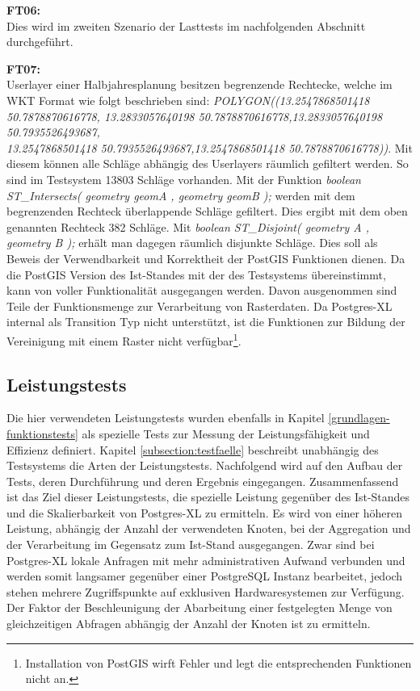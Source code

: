 \textbf{FT06:}\\
Dies wird im zweiten Szenario der Lasttests im nachfolgenden Abschnitt durchgeführt.

\textbf{FT07:}\\
Userlayer einer Halbjahresplanung besitzen begrenzende Rechtecke, welche im WKT Format wie folgt beschrieben sind: \textit{POLYGON((13.2547868501418 50.7878870616778,
13.2833057640198 50.7878870616778,13.2833057640198 50.7935526493687,\\
13.2547868501418 50.7935526493687,13.2547868501418 50.7878870616778))}.
Mit diesem können alle Schläge abhängig des Userlayers räumlich gefiltert werden.
So sind im Testsystem 13803 Schläge vorhanden.
Mit der Funktion \textit{boolean ST\_{}Intersects( geometry geomA , geometry geomB );} werden mit dem begrenzenden Rechteck überlappende Schläge gefiltert.
Dies ergibt mit dem oben genannten Rechteck 382 Schläge.
Mit \textit{boolean ST\_{}Disjoint( geometry A , geometry B );} erhält man dagegen räumlich disjunkte Schläge.
Dies soll als Beweis der Verwendbarkeit und Korrektheit der PostGIS Funktionen dienen.
Da die PostGIS Version des Ist-Standes mit der des Testsystems übereinstimmt, kann von voller Funktionalität  ausgegangen werden.
Davon ausgenommen sind Teile der Funktionsmenge zur Verarbeitung von Rasterdaten.
Da Postgres-XL internal als Transition Typ nicht unterstützt, ist die Funktionen zur Bildung der Vereinigung mit einem Raster nicht verfügbar\footnote{Installation von PostGIS wirft Fehler und legt die entsprechenden Funktionen nicht an.}.



\subsection{Leistungstests}
Die hier verwendeten Leistungstests wurden ebenfalls in Kapitel \ref{grundlagen-funktionstests} als spezielle Tests zur Messung der Leistungsfähigkeit und Effizienz definiert.
Kapitel \ref{subsection:testfaelle} beschreibt unabhängig des Testsystems die Arten der Leistungstests.
Nachfolgend wird auf den Aufbau der Tests, deren Durchführung und deren Ergebnis eingegangen.
Zusammenfassend ist das Ziel dieser Leistungstests, die spezielle Leistung gegenüber des Ist-Standes und die Skalierbarkeit von Postgres-XL zu ermitteln. %
Es wird von einer höheren Leistung, abhängig der Anzahl der verwendeten Knoten, bei der Aggregation und der Verarbeitung im Gegensatz zum Ist-Stand ausgegangen.
Zwar sind bei Postgres-XL lokale Anfragen mit mehr administrativen Aufwand verbunden und werden somit langsamer gegenüber einer PostgreSQL Instanz bearbeitet, jedoch stehen mehrere Zugriffspunkte auf exklusiven Hardwaresystemen zur Verfügung.
Der Faktor der Beschleunigung der Abarbeitung einer festgelegten Menge von gleichzeitigen Abfragen abhängig der Anzahl der Knoten ist zu ermitteln.

